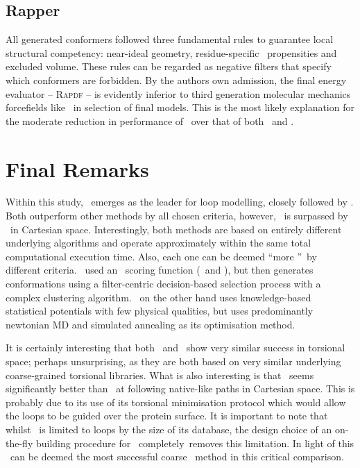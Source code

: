 \subsection{Rapper}

All generated
conformers followed three fundamental rules to guarantee
local structural competency: near-ideal geometry, residue-specific
\phipsi\ propensities and excluded volume. These
rules can be regarded as negative filters that specify which
conformers are forbidden.
By the authors own admission, the final energy evaluator -- \textsc{Rapdf} -- is evidently inferior to third generation molecular mechanics forcefields like \ambergbsa\ in selection of final models. This is the most likely explanation for the moderate reduction in performance of \rapper\ over that of both \plop\ and \modloop.



\section{Final Remarks}
\label{section:methcomp:final_remarks}

Within this study, \modloop\ emerges as the leader for loop modelling, closely followed by \plop. Both outperform other methods by all chosen criteria, however, \plop\ is surpassed by \modloop\ in Cartesian space. Interestingly, both methods are based on entirely different underlying algorithms and operate approximately within the same total computational execution time.
Also, each one can be deemed ``more \abinitio''\ by different criteria. \plop\ used an \abinitio\ scoring function (\opls\  and \gbsa), but then generates conformations using a filter-centric decision-based selection process with a complex clustering algorithm.
\modloop\ on the other hand uses knowledge-based statistical potentials with few physical qualities, but uses predominantly newtonian MD and simulated annealing as its optimisation method.

It is certainly interesting that both \petra\ and \prearcus\ show very similar success in torsional space; perhaps unsurprising, as they are both based on very similar underlying coarse-grained torsional libraries. What is also interesting is that \prearcus\ seems significantly better than \petra\ at following native-like paths in Cartesian space. This is probably due to its use of its torsional minimisation protocol which would allow the loops to be guided over the protein surface.
It is important to note that whilst \petra\ is limited to  loops by the size of its database, the design choice of an on-the-fly building procedure for \prearcus\ completely\ removes this limitation.
In light of this \prearcus\ can be deemed the most successful coarse \angleset\ method in this critical comparison.

